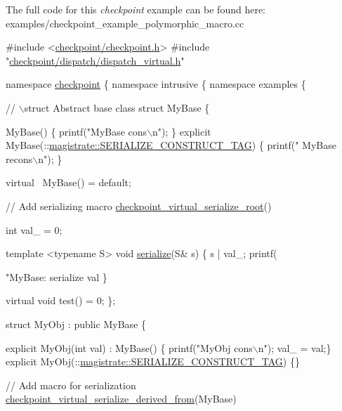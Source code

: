 The full code for this {\itshape checkpoint} example can be found here\+: {\ttfamily examples/checkpoint\+\_\+example\+\_\+polymorphic\+\_\+macro.\+cc}


\begin{DoxyCodeInclude}

\textcolor{preprocessor}{#include <\hyperlink{checkpoint_8h}{checkpoint/checkpoint.h}>}
\textcolor{preprocessor}{#include "\hyperlink{dispatch__virtual_8h}{checkpoint/dispatch/dispatch\_virtual.h}"}

\textcolor{keyword}{namespace }\hyperlink{namespacecheckpoint}{checkpoint} \{ \textcolor{keyword}{namespace }intrusive \{ \textcolor{keyword}{namespace }examples \{

\textcolor{comment}{// \(\backslash\)struct Abstract base class}
\textcolor{keyword}{struct }MyBase \{

  MyBase() \{ printf(\textcolor{stringliteral}{"MyBase cons\(\backslash\)n"}); \}
  \textcolor{keyword}{explicit} MyBase(::\hyperlink{structcheckpoint_1_1dispatch_1_1_s_e_r_i_a_l_i_z_e___c_o_n_s_t_r_u_c_t___t_a_g}{magistrate::SERIALIZE\_CONSTRUCT\_TAG}) \{ printf(\textcolor{stringliteral}{"
      MyBase recons\(\backslash\)n"}); \}

  \textcolor{keyword}{virtual} ~MyBase() = \textcolor{keywordflow}{default};

  \textcolor{comment}{// Add serializing macro}
  \hyperlink{lib_2checkpoint_2src_2checkpoint_2dispatch_2vrt_2base_8h_aa6062a11e9781a28fe043f10338238df}{checkpoint\_virtual\_serialize\_root}()

  int val\_ = 0;

  template <typename S>
  \textcolor{keywordtype}{void} \hyperlink{namespacecheckpoint_a075da4e7344cf037943362517e606c3a}{serialize}(S& s) \{
    s | val\_;
    printf(\textcolor{stringliteral}{"MyBase: serialize val %
  \}

  \textcolor{keyword}{virtual} \textcolor{keywordtype}{void} test() = 0;
\};

\textcolor{keyword}{struct }MyObj : \textcolor{keyword}{public} MyBase \{

  \textcolor{keyword}{explicit} MyObj(\textcolor{keywordtype}{int} val) : MyBase() \{ printf(\textcolor{stringliteral}{"MyObj cons\(\backslash\)n"}); val\_ = val;\}
  \textcolor{keyword}{explicit} MyObj(::\hyperlink{structcheckpoint_1_1dispatch_1_1_s_e_r_i_a_l_i_z_e___c_o_n_s_t_r_u_c_t___t_a_g}{magistrate::SERIALIZE\_CONSTRUCT\_TAG}) \{\}

  \textcolor{comment}{// Add macro for serialization}
  \hyperlink{derived_8h_acc015406441054fae32d63af2b86ca0d}{checkpoint\_virtual\_serialize\_derived\_from}(MyBase)

}
\end{DoxyCodeInclude}
